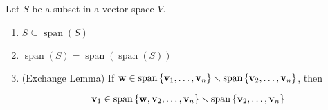 \begin{proposition} \label{prop:exchangelem}
Let \(S\) be a subset in a vector space \(V\).

\begin{enumerate}
\item \(S \subseteq  \operatorname{span}\left( S\right)\)

\item \(\operatorname{span}\left( S\right)  = \operatorname{span}\left( {\operatorname{span}\left( S\right) }\right)\)

\item (Exchange Lemma) If \(\mathbf{w} \in  \operatorname{span}\left\{  {{\bf v}_1,\ldots ,{\bf v}_n}\right\}   \smallsetminus  \operatorname{span}\left\{  {{\bf v}_2,\ldots ,{\bf v}_n}\right\}\), then

\[
{\bf v}_1 \in  \operatorname{span}\left\{  {\mathbf{w},{\bf v}_2,\ldots ,{\bf v}_n}\right\}   \smallsetminus  \operatorname{span}\left\{  {{\bf v}_2,\ldots ,{\bf v}_n}\right\}
\]
\end{enumerate}
\end{proposition}

